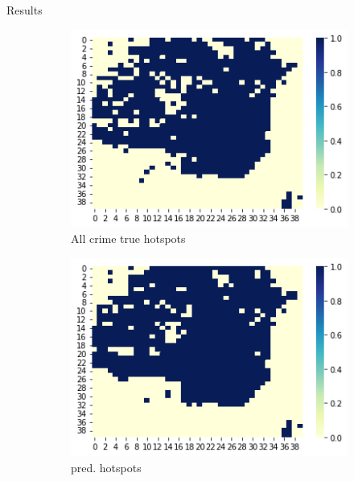 \documentclass[10pt]{beamer}
\begin{document}
\begin{frame}{Results}

\begin{figure}[!htb]
{\tiny
    \centering
    \begin{subfigure}{.32\textwidth}
        \centering
        \includegraphics[width=1\linewidth, height=0.3\textheight]{true_hotspots.png}
        \caption{All crime true hotspots}
    \end{subfigure}%
    \begin{subfigure}{0.32\textwidth}
        \centering
        \includegraphics[width=1\linewidth, height=0.3\textheight]{pred_hotspots.png}
        \caption{pred. hotspots}
    \end{subfigure}%
    \begin{subfigure}{0.32\textwidth}

\end{subfigure}}
\end{figure}
\end{frame}
\end{document}
